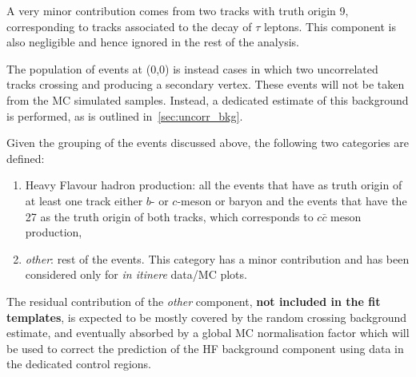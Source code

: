 A very minor contribution comes from two tracks with truth origin 9, corresponding to tracks associated to the decay of $\tau$ leptons. This component is also negligible and hence ignored in the rest of the analysis.

The population of events at (0,0) is instead cases in which two uncorrelated tracks crossing and producing a secondary vertex. These events will not be taken from the MC simulated samples. Instead, a dedicated estimate of this background is performed, as is outlined in~\cref{sec:uncorr_bkg}.

Given the grouping of the events discussed above, the following two categories are defined:
\begin{enumerate}
    \item Heavy Flavour hadron production: all the events that have as truth origin of at least one track either $b$- or $c$-meson or baryon and the events that have the 27 as the truth origin of both tracks, which corresponds to $c\bar{c}$ meson production,
    \item \textit{other}: rest of the events. This category has a minor contribution and has been considered only for \textit{in itinere} data/MC plots.
\end{enumerate}

The residual contribution of the \textit{other} component, \textbf{not included in the fit templates}, is expected to be mostly covered by the random crossing background estimate, and eventually absorbed by a global MC normalisation factor which will be used to correct the prediction of the HF background component using data in the dedicated control regions.


